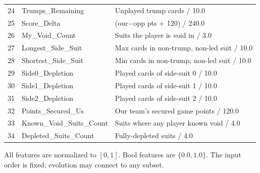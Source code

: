 \documentclass[runningheads]{llncs}
\begin{document}
\begin{tabular}{clp{6.5cm}}
24 & Trumps\_Remaining   & Unplayed trump cards / 10.0 \\
25 & Score\_Delta        & (our$-$opp pts $+$ 120) / 240.0 \\
26 & My\_Void\_Count     & Suits the player is void in / 3.0 \\
27 & Longest\_Side\_Suit & Max cards in non-trump, non-led suit / 10.0 \\
28 & Shortest\_Side\_Suit& Min cards in non-trump, non-led suit / 10.0 \\
29 & Side0\_Depletion    & Played cards of side-suit 0 / 10.0 \\
30 & Side1\_Depletion    & Played cards of side-suit 1 / 10.0 \\
31 & Side2\_Depletion    & Played cards of side-suit 2 / 10.0 \\
32 & Points\_Secured\_Us & Our team's secured game points / 120.0 \\
33 & Known\_Void\_Suits\_Count & Suits where any player known void / 4.0 \\
34 & Depleted\_Suits\_Count    & Fully-depleted suits / 4.0 \\
\bottomrule
\end{tabular}

\vspace{6pt}
All features are normalized to $[0, 1]$. Bool features are $\{0.0, 1.0\}$. The
input order is fixed; evolution may connect to any subset.
\end{document}
